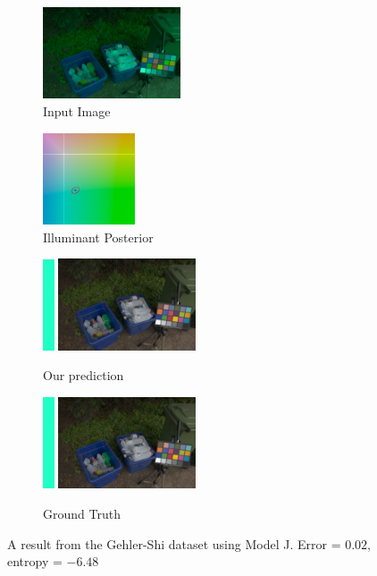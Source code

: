 \documentclass[10pt,twocolumn,letterpaper]{article}
\begin{document}
\begin{figure}[!]
\centering
  \begin{subfigure}[!]{1.7in}
    \includegraphics[width=1.6in]{figures/results/gehlershi/00000300_input.jpg}
    \caption{\footnotesize Input Image}
  \end{subfigure}
  \begin{subfigure}[!]{1.17in}
    \includegraphics[width=1.07in]{figures/results/gehlershi/00000300_chroma.png}
    \caption{\footnotesize Illuminant Posterior}
  \end{subfigure}
\begin{subfigure}[!]{1.9in}
    \includegraphics[width=0.133in]{figures/results/gehlershi/00000300_illum.png}\!
    \includegraphics[width=1.6in]{figures/results/gehlershi/00000300_prediction.jpg}
    \caption{\footnotesize Our prediction}
  \end{subfigure}
  \begin{subfigure}[!]{1.9in}
    \includegraphics[width=0.133in]{figures/results/gehlershi/00000300_illum_true.png}\!
    \includegraphics[width=1.6in]{figures/results/gehlershi/00000300_true.jpg}
    \caption{\footnotesize Ground Truth}
  \end{subfigure}
  \caption{
    A result from the Gehler-Shi dataset using Model J. Error = $0.02$\textdegree, entropy = $-6.48$
    \label{fig:results1}
  }
\end{figure}
\end{document}
